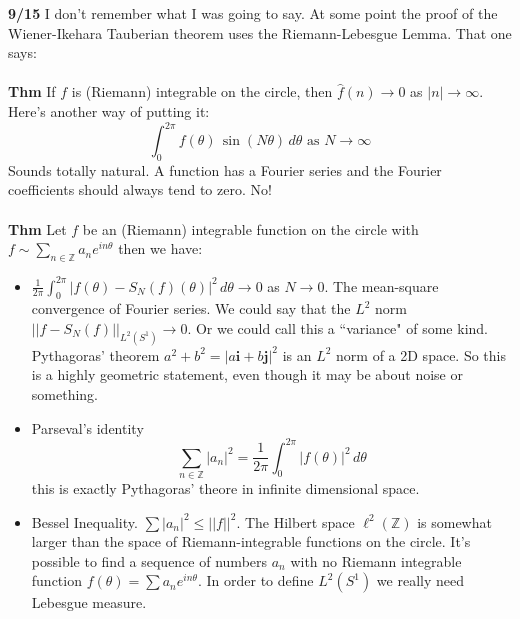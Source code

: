 \documentclass[12pt]{article}
\begin{document}
\noindent \textbf{9/15} I don't remember what I was going to say.  At some point the proof of the Wiener-Ikehara Tauberian theorem uses the Riemann-Lebesgue Lemma.  That one says: \\ \\
\textbf{Thm} If $f$ is (Riemann) integrable on the circle, then $\hat{f}(n) \to 0$ as $|n| \to \infty$. Here's another way of putting it:
$$ \int_0^{2\pi} f(\theta) \, \sin (N\theta) \, d\theta \text{ as } N \to \infty $$
Sounds totally natural.  A function has a Fourier series and the Fourier coefficients should always tend to zero.  No!  \\ \\
\textbf{Thm} Let $f$ be an (Riemann) integrable function on the circle with $f \sim \sum_{n \in \mathbb{Z}} a_n e^{in\theta}$ then we have:
\begin{itemize}
\item $\displaystyle \frac{1}{2\pi}\int_0^{2\pi} | f(\theta) - S_N(f)(\theta)|^2 \, d\theta \to 0 $ as $N \to 0$.  The mean-square convergence of Fourier series.   We could say that the $L^2$ norm $||f - S_N(f)||_{L^2(S^1)} \to 0$.  Or we could call this a ``variance" of some kind.  Pythagoras' theorem $a^2 + b^2 = |a \mathbf{i} + b \mathbf{j}|^2$ is an $L^2$ norm of a 2D space.  So this is a highly geometric statement, even though it may be about noise or something.
\item Parseval's identity
$$ \sum_{n \in \mathbb{Z}} |a_n|^2 = \frac{1}{2\pi}\int_0^{2\pi} |f(\theta)|^2 \, d\theta $$
this is exactly Pythagoras' theore in infinite dimensional space.
\item Bessel Inequality.  $ \sum |a_n|^2 \leq ||f||^2$.  The Hilbert space $\ell^2(\mathbb{Z})$ is somewhat larger than the space of Riemann-integrable functions on the circle.   It's possible to find a sequence of numbers $a_n$ with no Riemann integrable function $f(\theta) = \sum a_n e^{in\theta}$. In order to define $L^2(S^1)$ we really need Lebesgue measure. 
\end{itemize} 
\end{document}

